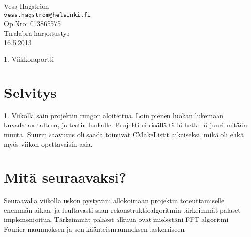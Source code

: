 \documentclass[12pt,a4paper]{report}
\author{Vesa Hagström}
\begin{document}
    \renewcommand{\bibname}{Viitteet}

	\begin{titlepage}
    \label{Title}
	\begin{flushleft}
		\hfill Vesa Hagström 											\\
		\hfill \texttt{vesa.hagstrom@helsinki.fi} 						\\
		\hfill Op.Nro: 013865575											\\
		\hfill Tiralabra harjoitustyö									\\
		\hfill 16.5.2013													\\
	\end{flushleft}

	\vfill

	\begin{center}
		\huge{1. Viikkoraportti}
	\end{center}

	\vfill

	\end{titlepage}

    \section*{Selvitys}
    1. Viikolla sain projektin rungon aloitettua. Loin pienen luokan lukemaan kuvadatan talteen, ja testin luokalle. Projekti ei sisällä tällä hetkellä juuri mitään muuta. Suurin saavutus oli saada toimivat CMakeListit aikaiseksi, mikä oli ehkä myös viikon opettavaisin asia.
    
    \section*{Mitä seuraavaksi?}
    Seuraavalla viikolla uskon pystyväni allokoimaan projektin toteuttamiselle enemmän aikaa, ja luultavasti saan rekonstruktioalgoritmin tärkeimmät palaset implementoitua. Tärkeimmät palaset alkuun ovat mielestäni FFT algoritmi Fourier-muunnoksen ja sen käänteismuunnoksen laskemiseen.
    
\end{document}
